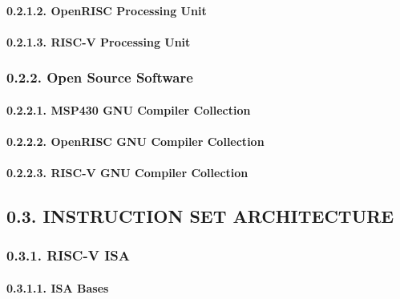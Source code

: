 \documentclass[
]{article}
\begin{document}
\hypertarget{openrisc-processing-unit}{%
\paragraph{0.2.1.2. OpenRISC Processing
Unit}\label{openrisc-processing-unit}}

\hypertarget{risc-v-processing-unit}{%
\paragraph{0.2.1.3. RISC-V Processing
Unit}\label{risc-v-processing-unit}}

\hypertarget{open-source-software}{%
\subsubsection{0.2.2. Open Source Software}\label{open-source-software}}

\hypertarget{msp430-gnu-compiler-collection}{%
\paragraph{0.2.2.1. MSP430 GNU Compiler
Collection}\label{msp430-gnu-compiler-collection}}

\hypertarget{openrisc-gnu-compiler-collection}{%
\paragraph{0.2.2.2. OpenRISC GNU Compiler
Collection}\label{openrisc-gnu-compiler-collection}}

\hypertarget{risc-v-gnu-compiler-collection}{%
\paragraph{0.2.2.3. RISC-V GNU Compiler
Collection}\label{risc-v-gnu-compiler-collection}}

\hypertarget{instruction-set-architecture}{%
\subsection{0.3. INSTRUCTION SET
ARCHITECTURE}\label{instruction-set-architecture}}

\hypertarget{risc-v-isa}{%
\subsubsection{0.3.1. RISC-V ISA}\label{risc-v-isa}}

\hypertarget{isa-bases}{%
\paragraph{0.3.1.1. ISA Bases}\label{isa-bases}}
\end{document}
